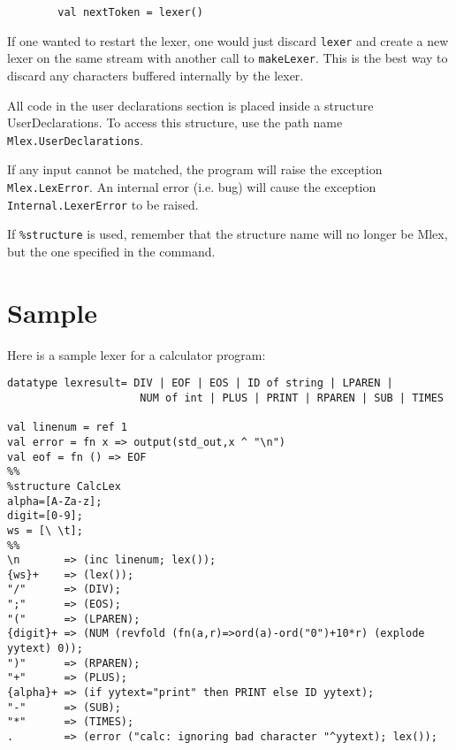 \begin{verbatim}
        val nextToken = lexer()
\end{verbatim}

If one wanted to restart the lexer, one would just discard {\tt lexer}
and create a new lexer on the same stream with another call to
{\tt makeLexer}.  This is the best way to discard any characters buffered
internally by the lexer.

All code in the user declarations section is placed inside a
structure UserDeclarations.  To access this structure, use the path name
{\tt Mlex.UserDeclarations}.

If any input cannot be matched, the program will raise the exception
{\tt Mlex.LexError}.  An internal error (i.e.  bug) will cause the
exception {\tt Internal.LexerError} to be raised.

If {\tt \%structure} is used, remember that the structure name will no
longer be Mlex, but the one specified in the command.

\section{Sample}

Here is a sample lexer for a calculator program:

\small
\begin{verbatim}
datatype lexresult= DIV | EOF | EOS | ID of string | LPAREN |
                     NUM of int | PLUS | PRINT | RPAREN | SUB | TIMES 

val linenum = ref 1
val error = fn x => output(std_out,x ^ "\n")
val eof = fn () => EOF
%%
%structure CalcLex
alpha=[A-Za-z];
digit=[0-9];
ws = [\ \t];
%%
\n       => (inc linenum; lex());
{ws}+    => (lex());
"/"      => (DIV);
";"      => (EOS);
"("      => (LPAREN);
{digit}+ => (NUM (revfold (fn(a,r)=>ord(a)-ord("0")+10*r) (explode yytext) 0));
")"      => (RPAREN);
"+"      => (PLUS);
{alpha}+ => (if yytext="print" then PRINT else ID yytext);
"-"      => (SUB);
"*"      => (TIMES);
.        => (error ("calc: ignoring bad character "^yytext); lex());
\end{verbatim}


